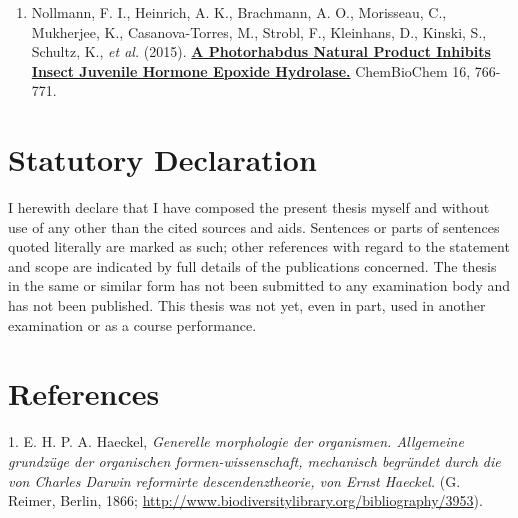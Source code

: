 \documentclass[11pt,singlespacinge,twoside]{reedthesis} %
\providecommand{\tightlist}{%
  \setlength{\itemsep}{0pt}\setlength{\parskip}{0pt}}
\begin{document}
 \hrulefill
\vspace{0.2cm}
\begin{enumerate}
\def\labelenumi{\arabic{enumi}.}
\tightlist
\item
  Nollmann, F. I., Heinrich, A. K., Brachmann, A. O., Morisseau, C., Mukherjee, K., Casanova-Torres, M., Strobl, F., Kleinhans, D., Kinski, S., Schultz, K., \emph{et al.} (2015). \href{https://onlinelibrary.wiley.com/doi/abs/10.1002/cbic.201402650}{\textbf{A Photorhabdus Natural Product Inhibits Insect Juvenile Hormone Epoxide Hydrolase.}} ChemBioChem 16, 766-771.
\end{enumerate}
\hypertarget{statutory-declaration}{%
\chapter*{\texorpdfstring{\textbf{Statutory Declaration}}{Statutory Declaration}}\label{statutory-declaration}}

I herewith declare that I have composed the present thesis myself and without use of any other than the
cited sources and aids. Sentences or parts of sentences quoted literally are marked as such; other references
with regard to the statement and scope are indicated by full details of the publications concerned. The thesis
in the same or similar form has not been submitted to any examination body and has not been published.
This thesis was not yet, even in part, used in another examination or as a course performance.

\vskip 2cm
\centerline{\makebox[6cm][c]{\hrulefill} \makebox[0.5cm][c]{} \makebox[6cm][c]{\hrulefill}}
\centerline{\makebox[0.5cm][c]{} }

\backmatter

\hypertarget{references}{%
\chapter*{References}\label{references}}


\noindent

\setlength{\parindent}{-0.20in}
\setlength{\leftskip}{0.20in}
\setlength{\parskip}{8pt}

\hypertarget{refs}{}
\leavevmode\hypertarget{ref-Haeckel1866}{}%
1. E. H. P. A. Haeckel, \emph{Generelle morphologie der organismen. Allgemeine grundzüge der organischen formen-wissenschaft, mechanisch begründet durch die von Charles Darwin reformirte descendenztheorie, von Ernst Haeckel.} (G. Reimer, Berlin, 1866; \url{http://www.biodiversitylibrary.org/bibliography/3953}).
\end{document}
